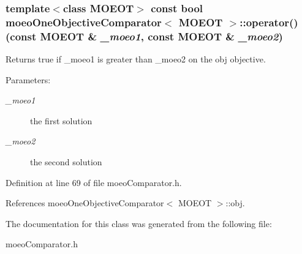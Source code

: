 \subsubsection{\setlength{\rightskip}{0pt plus 5cm}template$<$class MOEOT$>$ const bool {\bf moeo\-One\-Objective\-Comparator}$<$ MOEOT $>$::operator() (const MOEOT \& {\em \_\-moeo1}, const MOEOT \& {\em \_\-moeo2})\hspace{0.3cm}{\tt  [inline]}}\label{classmoeoOneObjectiveComparator_962a4cbc308c30a83c9c485a79374f6a}


Returns true if \_\-moeo1 is greater than \_\-moeo2 on the obj objective. 

\begin{Desc}
\item[Parameters:]
\begin{description}
\item[{\em \_\-moeo1}]the first solution \item[{\em \_\-moeo2}]the second solution \end{description}
\end{Desc}


Definition at line 69 of file moeo\-Comparator.h.

References moeo\-One\-Objective\-Comparator$<$ MOEOT $>$::obj.

The documentation for this class was generated from the following file:\begin{CompactItemize}
\item 
moeo\-Comparator.h\end{CompactItemize}
